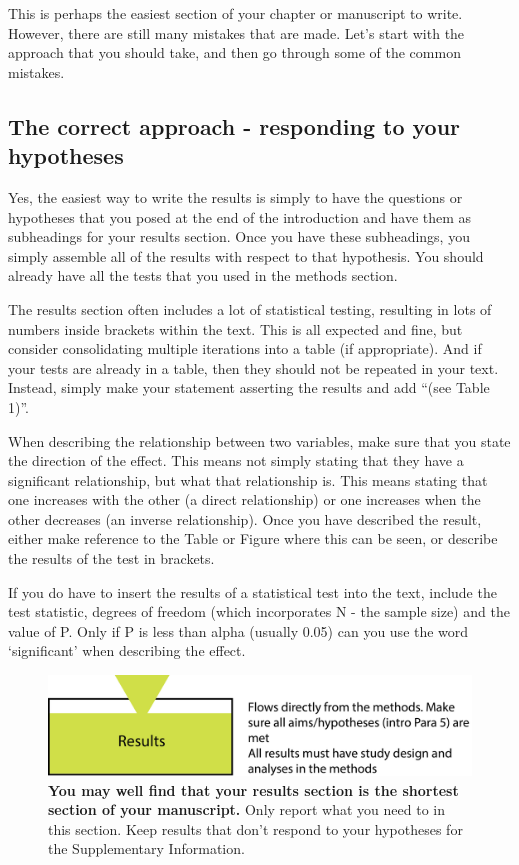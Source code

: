 \documentclass[
]{krantz}
\begin{document}
This is perhaps the easiest section of your chapter or manuscript to write. However, there are still many mistakes that are made. Let's start with the approach that you should take, and then go through some of the common mistakes.

\hypertarget{the-correct-approach---responding-to-your-hypotheses}{%
\subsection{The correct approach - responding to your hypotheses}\label{the-correct-approach---responding-to-your-hypotheses}}

Yes, the easiest way to write the results is simply to have the questions or hypotheses that you posed at the end of the introduction and have them as subheadings for your results section. Once you have these subheadings, you simply assemble all of the results with respect to that hypothesis. You should already have all the tests that you used in the methods section.

The results section often includes a lot of statistical testing, resulting in lots of numbers inside brackets within the text. This is all expected and fine, but consider consolidating multiple iterations into a table (if appropriate). And if your tests are already in a table, then they should not be repeated in your text. Instead, simply make your statement asserting the results and add ``(see Table 1)''.

When describing the relationship between two variables, make sure that you state the direction of the effect. This means not simply stating that they have a significant relationship, but what that relationship is. This means stating that one increases with the other (a direct relationship) or one increases when the other decreases (an inverse relationship). Once you have described the result, either make reference to the Table or Figure where this can be seen, or describe the results of the test in brackets.

If you do have to insert the results of a statistical test into the text, include the test statistic, degrees of freedom (which incorporates N - the sample size) and the value of P. Only if P is less than alpha (usually 0.05) can you use the word `significant' when describing the effect.



\begin{figure}
\includegraphics[width=0.95\linewidth]{figures/results} \caption{\textbf{You may well find that your results section is the shortest section of your manuscript.} Only report what you need to in this section. Keep results that don't respond to your hypotheses for the Supplementary Information.}\label{fig:results}
\end{figure}
\end{document}
